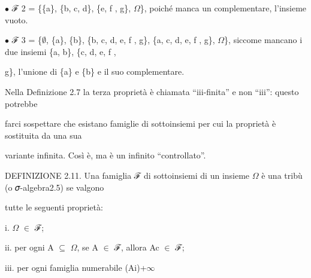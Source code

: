 \documentclass[a4paper,portrait,12pt]{article}
\begin{document}
\begin{flushleft}
$\bullet$ ℱ 2 = \{\{a\}, \{b, c, d\}, \{e, f , g\}, $\Omega$\}, poich\'{e} manca un complementare, l'insieme vuoto.
\end{flushleft}


\begin{flushleft}
$\bullet$ ℱ 3 = \{$\emptyset$, \{a\}, \{b\}, \{b, c, d, e, f , g\}, \{a, c, d, e, f , g\}, $\Omega$\}, siccome mancano i due insiemi \{a, b\}, \{c, d, e, f ,
\end{flushleft}


\begin{flushleft}
g\}, l'unione di \{a\} e \{b\} e il suo complementare.
\end{flushleft}


\begin{flushleft}
Nella Definizione 2.7 la terza propriet\`{a} \`{e} chiamata {``}iii-finita'' e non {``}iii'': questo potrebbe
\end{flushleft}


\begin{flushleft}
farci sospettare che esistano famiglie di sottoinsiemi per cui la propriet\`{a} \`{e} sostituita da una sua
\end{flushleft}


\begin{flushleft}
variante infinita. Così \`{e}, ma \`{e} un infinito {``}controllato''.
\end{flushleft}


\begin{flushleft}
DEFINIZIONE 2.11. Una famiglia ℱ di sottoinsiemi di un insieme $\Omega$ \`{e} una tribù (o 𝜎-algebra2.5) se valgono
\end{flushleft}


\begin{flushleft}
tutte le seguenti propriet\`{a}:
\end{flushleft}


\begin{flushleft}
i. $\Omega$ $\in$ ℱ;
\end{flushleft}


\begin{flushleft}
ii. per ogni A $\subseteq$ $\Omega$, se A $\in$ ℱ, allora Ac $\in$ ℱ;
\end{flushleft}


\begin{flushleft}
iii. per ogni famiglia numerabile (Ai)+$\infty$
\end{flushleft}
\end{document}
